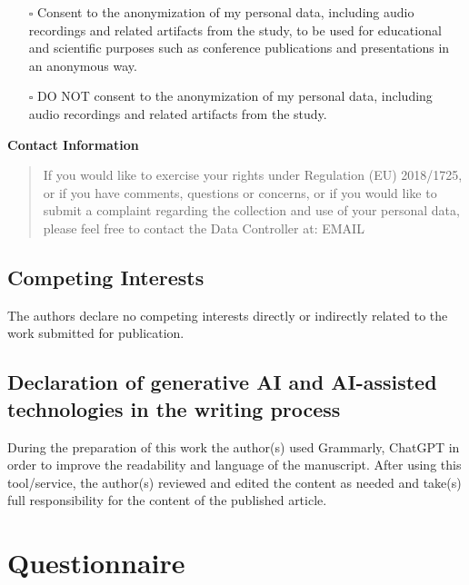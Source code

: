 \documentclass[
  12pt,
]{article}
\providecommand{\tightlist}{%
  \setlength{\itemsep}{0pt}\setlength{\parskip}{0pt}}
\begin{document}
\begin{itemize}
\tightlist
\item[$\square$]
  Consent to the anonymization of my personal data, including audio recordings and related artifacts from the study, to be used for educational and scientific purposes such as conference publications and presentations in an anonymous way.
\item[$\square$]
  DO NOT consent to the anonymization of my personal data, including audio recordings and related artifacts from the study.
\end{itemize}

\textbf{Contact Information}

\begin{quote}
If you would like to exercise your rights under Regulation (EU) 2018/1725, or if you have comments, questions or concerns, or if you would like to submit a complaint regarding the collection and use of your personal data, please feel free to contact the Data Controller at: EMAIL
\end{quote}

\subsection{Competing Interests}\label{competing-interests}

The authors declare no competing interests directly or indirectly related to the work submitted for publication.

\subsection{Declaration of generative AI and AI-assisted technologies in the writing process}\label{declaration-of-generative-ai-and-ai-assisted-technologies-in-the-writing-process}

During the preparation of this work the author(s) used Grammarly, ChatGPT in order to improve the readability and language of the manuscript. After using this tool/service, the author(s) reviewed and edited the content as needed and take(s) full responsibility for the content of the published article.

\newpage

\section{Questionnaire}\label{sec:questionnaire}
\end{document}
